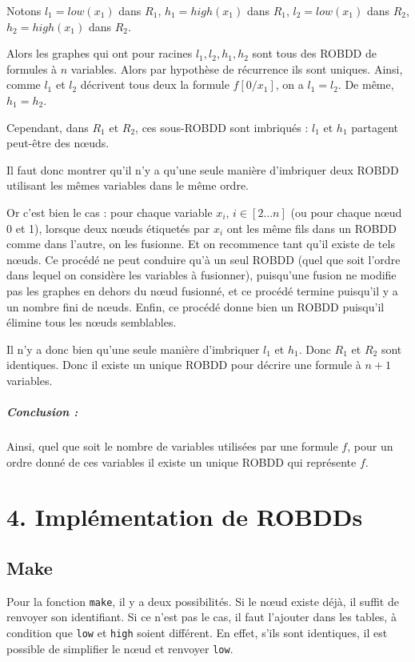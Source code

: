 \documentclass[12pt]{article}
\def\code#1{\texttt{#1}}
\begin{document}
Notons $l_1 = low(x_1)$ dans $R_1$,  $h_1 = high(x_1)$ dans $R_1$, $l_2 = low(x_1)$ dans $R_2$,  $h_2 = high(x_1)$ dans $R_2$.

Alors les graphes qui ont pour racines $l_1, l_2, h_1, h_2$ sont tous des ROBDD de formules à $n$ variables. Alors par hypothèse de récurrence ils sont uniques. Ainsi, comme $l_1$ et $l_2$ décrivent tous deux la formule $f[0/x_1]$, on a $l_1=l_2$. De même, $h_1=h_2$.

Cependant, dans $R_1$ et $R_2$, ces sous-ROBDD sont imbriqués : $l_1$ et $h_1$ partagent peut-être des n\oe uds.

Il faut donc montrer qu'il n'y a qu'une seule manière d'imbriquer deux ROBDD utilisant les mêmes variables dans le même ordre.

Or c'est bien le cas : pour chaque variable $x_i$, $i\in[2\dots n]$ (ou pour chaque n\oe ud 0 et 1), lorsque deux n\oe uds étiquetés par $x_i$ ont les même fils dans un ROBDD comme dans l'autre, on les fusionne. Et on recommence tant qu'il existe de tels n\oe uds. Ce procédé ne peut conduire qu'à un seul ROBDD (quel que soit l'ordre dans lequel on considère les variables à fusionner), puisqu'une fusion ne modifie pas les graphes en dehors du n\oe ud fusionné, et ce procédé termine puisqu'il y a un nombre fini de n\oe uds. Enfin, ce procédé donne bien un ROBDD puisqu'il élimine tous les n\oe uds semblables.

Il n'y a donc bien qu'une seule manière d'imbriquer $l_1$ et $h_1$. Donc $R_1$ et $R_2$ sont identiques. Donc il existe un unique ROBDD pour décrire une formule à $n+1$ variables.

\subparagraph{Conclusion :} Ainsi, quel que soit le nombre de variables utilisées par une formule $f$, pour un ordre donné de ces variables il existe un unique ROBDD qui représente $f$.


\section*{4. Implémentation de ROBDDs}
\subsection*{Make}
Pour la fonction \code{make}, il y a deux possibilités. Si le n\oe ud existe déjà, il suffit de renvoyer son identifiant.
Si ce n'est pas le cas, il faut l'ajouter dans les tables, à condition que \code{low} et \code{high} soient différent. En effet, s'ils sont identiques, il est possible de simplifier le n\oe ud et renvoyer \code{low}.
\end{document}
